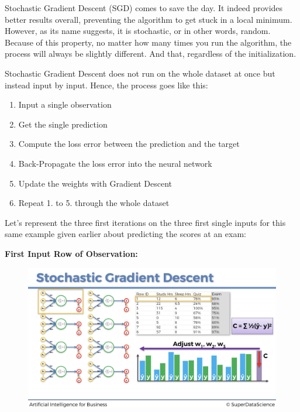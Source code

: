 \documentclass[]{book}
\begin{document}
Stochastic Gradient Descent (SGD) comes to save the day. It indeed provides better results overall, preventing the algorithm to get stuck in a local minimum. However, as its name suggests, it is stochastic, or in other words, random. Because of this property, no matter how many times you run the algorithm, the process will always be slightly different. And that, regardless of the initialization.

Stochastic Gradient Descent does not run on the whole dataset at once but instead input by input. Hence, the process goes like this:

\begin{enumerate}
    \item Input a single observation
    \item Get the single prediction
    \item Compute the loss error between the prediction and the target
    \item Back-Propagate the loss error into the neural network
    \item Update the weights with Gradient Descent
    \item Repeat 1. to 5. through the whole dataset
\end{enumerate}

Let's represent the three first iterations on the three first single inputs for this same example given earlier about predicting the scores at an exam:

\textbf{First Input Row of Observation:}

\begin{figure}[!htbp]
        \begin{center}
            \includegraphics[scale=0.18]{ANN_27.png}
        \end{center}
\end{figure}
\end{document}
